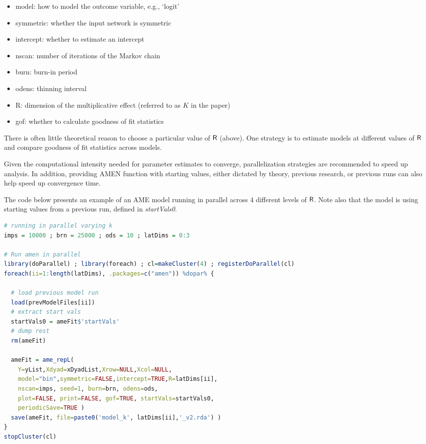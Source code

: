 \begin{itemize}
    \item model: how to model the outcome variable, e.g., `logit'
    \item symmetric: whether the input network is symmetric
    \item intercept: whether to estimate an intercept
    \item nscan: number of iterations of the Markov chain
    \item burn: burn-in period
    \item odens: thinning interval
    \item R: dimension of the multiplicative effect (referred to as $K$ in the paper)
    \item gof: whether to calculate goodness of fit statistics
\end{itemize}

There is often little theoretical reason to choose a particular value of $\sf{R}$ (above). One strategy is to estimate models at different values of $\sf{R}$ and compare goodness of fit statistics across models. 

Given the computational intensity needed for parameter estimates to converge, parallelization strategies are recommended to speed up analysis. In addition, providing AMEN function with starting values, either dictated by theory, previous research, or previous runs can also help speed up convergence time. 

The code below presents an example of an AME model running in parallel across 4 different levels of $\sf{R}$. Note also that the model is using starting values from a previous run, defined in \textit{startVals0}. 

\begin{lstlisting}[language=R]
# running in parallel varying k
imps = 10000 ; brn = 25000 ; ods = 10 ; latDims = 0:3

# Run amen in parallel
library(doParallel) ; library(foreach) ; cl=makeCluster(4) ; registerDoParallel(cl)
foreach(ii=1:length(latDims), .packages=c("amen")) %dopar% {
  
  # load previous model run
  load(prevModelFiles[ii])
  # extract start vals
  startVals0 = ameFit$'startVals'
  # dump rest
  rm(ameFit)
  
  ameFit = ame_repL(
    Y=yList,Xdyad=xDyadList,Xrow=NULL,Xcol=NULL, 
    model="bin",symmetric=FALSE,intercept=TRUE,R=latDims[ii], 
    nscan=imps, seed=1, burn=brn, odens=ods, 
    plot=FALSE, print=FALSE, gof=TRUE, startVals=startVals0,
    periodicSave=TRUE )     
  save(ameFit, file=paste0('model_k', latDims[ii],'_v2.rda') )
}
stopCluster(cl)
\end{lstlisting}